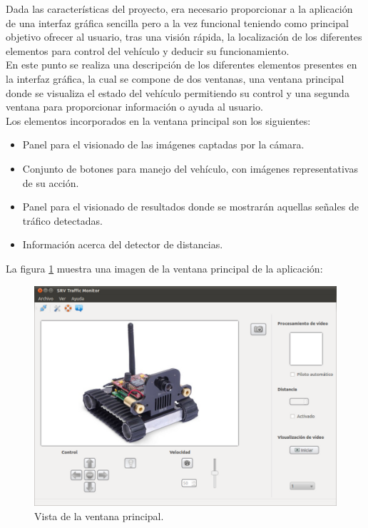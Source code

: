 \documentclass[a4paper,12pt]{article}
\begin{document}
Dada las características del proyecto, era necesario proporcionar a la aplicación de una interfaz gráfica sencilla pero a la vez funcional teniendo como principal objetivo ofrecer al usuario, tras una visión rápida, la localización de los diferentes elementos para control del vehículo y deducir su funcionamiento.\\

En este punto se realiza una descripción de los diferentes elementos presentes en la interfaz gráfica, la cual se compone de dos ventanas, una ventana principal donde se visualiza el estado del vehículo permitiendo su control y una segunda ventana para proporcionar información o ayuda al usuario.\\

Los elementos incorporados en la ventana principal son los siguientes:

\begin{itemize}

\item Panel para el visionado de las imágenes captadas por la cámara.

\item Conjunto de botones para manejo del vehículo, con imágenes representativas de su acción.

\item Panel para el visionado de resultados donde se mostrarán aquellas señales de tráfico detectadas.

\item Información acerca del detector de distancias.

\end{itemize}

La figura \ref{fig:ventana-principal} muestra una imagen de la ventana principal de la aplicación:\\

\begin{figure}[H]
  \begin{center}
    \includegraphics[scale=0.5]{imagenes/ventana-principal.png}
  \end{center}
  \caption{Vista de la ventana principal.}
  \label{fig:ventana-principal}
\end{figure}
\end{document}
